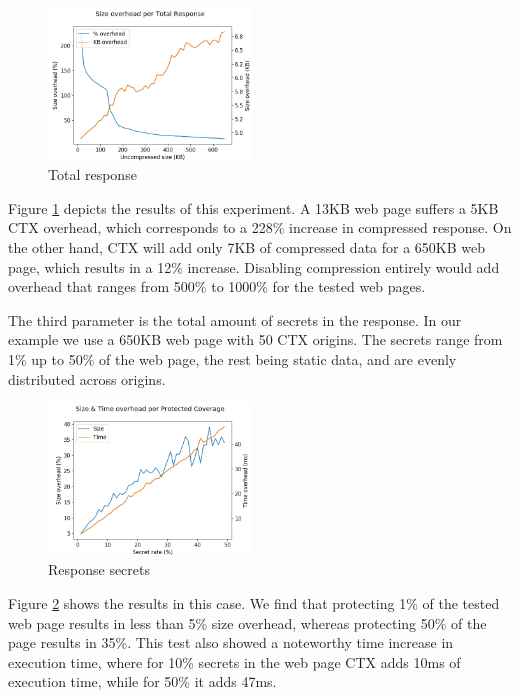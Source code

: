     \begin{figure}[thpb]
        \centering
            \includegraphics[width=0.48\textwidth]{experiments/total_response.png}
        \caption{Total response}
        \label{fig:total_response_ctx}
    \end{figure}

Figure \ref{fig:total_response_ctx} depicts the results of this experiment. A 13KB web page suffers a 5KB
CTX overhead, which corresponds to a 228\% increase in compressed response. On the
other hand, CTX will add only 7KB of compressed data for a 650KB web page, which
results in a 12\% increase. Disabling compression entirely would add overhead
that ranges from 500\% to 1000\% for the tested web pages.

The third parameter is the total amount of secrets in the response. In our
example we use a 650KB web page with 50 CTX origins. The secrets range from 1\%
up to 50\% of the web page, the rest being static data, and are evenly
distributed across origins.

    \begin{figure}[thpb]
        \centering
            \includegraphics[width=0.48\textwidth]{experiments/response_secrets.png}
        \caption{Response secrets}
        \label{fig:response_secrets_ctx}
    \end{figure}

Figure \ref{fig:response_secrets_ctx} shows the results in this case. We find that protecting 1\% of the
tested web page results in less than 5\% size overhead, whereas protecting 50\% of
the page results in 35\%. This test also showed a noteworthy time increase in
execution time, where for 10\% secrets in the web page CTX adds 10ms of
execution time, while for 50\% it adds 47ms.

